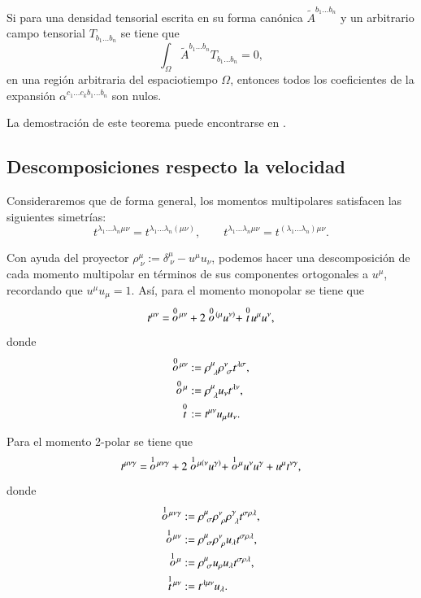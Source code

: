 \begin{theorem}
\label{teo:2}
Si para una densidad tensorial escrita en su forma canónica $\tilde{A}^{b_1 \dots b_n}$ y un arbitrario campo tensorial $T_{b_1 \dots b_n}$ se tiene que
\begin{equation}
\int_{\Omega}  \tilde{A}^{b_1 \dots b_n}T_{b_1 \dots b_n} = 0,
\end{equation}
en una región arbitraria del espaciotiempo $\Omega$, entonces todos los coeficientes de la expansión $\alpha^{c_1 \dots c_k b_1 \dots b_n}$ son nulos.
\end{theorem}

La demostración de este teorema puede encontrarse en \cite{Tulczyjew}.

\subsection{Descomposiciones respecto la velocidad}

Consideraremos que de forma general, los momentos multipolares satisfacen las siguientes simetrías:
\begin{equation}
t^{\lambda_1 \dots \lambda_n \mu \nu} = t^{\lambda_1 \dots \lambda_n (\mu \nu)}, \qquad t^{\lambda_1 \dots \lambda_n \mu \nu} = t^{(\lambda_1 \dots \lambda_n) \mu \nu}.
\end{equation}

Con ayuda del proyector $\rho^{\mu}_{\ \nu} := \delta^{\mu}_{\ \nu} - u^{\mu}u_{\nu}$, podemos hacer una descomposición de cada momento multipolar en términos de sus componentes ortogonales a $u^{\mu}$, recordando que $u^{\mu}u_{\mu} = 1$. Así, para el momento monopolar se tiene que
\begin{equation}
\label{eq:23}
t^{\mu \nu} = \ \stackrel{0}{o}{\!}^{\mu \nu} + 2 \stackrel{0}{o}{\!}^{(\mu} u^{\nu )} + \stackrel{0}{t}{\!} u^{\mu} u^{\nu},
\end{equation}
donde
\begin{align*}
\des{0}{o}^{\mu \nu} &:=  \rho^{\mu}_{\ \lambda} \rho^{\nu}_{\ \sigma} t^{\lambda \sigma},\\
\des{0}{o}^{\mu} &:= \rho^{\mu}_{\ \lambda} u_{\nu} t^{\lambda \nu},\\
\des{0}{t} &:= t^{\mu \nu} u_{\mu} u_{\nu}.
\end{align*}

Para el momento 2-polar se tiene que
\begin{equation}
\label{eq:24}
t^{\mu \nu \gamma} = \ \stackrel{1}{o}{\!}^{\mu \nu \gamma} + 2 \stackrel{1}{o}{\!}^{\mu ( \nu} u^{\gamma )} + \stackrel{1}{o}{\!}^{\mu} u^{\nu} u^{\gamma} + u^{\mu} t^{\nu \gamma},
\end{equation}
donde
\begin{align*}
\des{1}{o}^{\mu \nu \gamma} &:= \rho^{\mu}_{\ \sigma} \rho^{\nu}_{\ \rho} \rho^{\gamma}_{\ \lambda} t^{\sigma \rho \lambda},\\
\des{1}{o}^{\mu \nu} &:= \rho^{\mu}_{\ \sigma} \rho^{\nu}_{\ \rho} u_{\lambda} t^{\sigma \rho \lambda},\\
\des{1}{o}^{\mu} &:= \rho^{\mu}_{\ \sigma} u_{\rho} u_{\lambda} t^{\sigma \rho \lambda},\\
\des{1}{t}^{\mu \nu} &:= t^{\lambda \mu \nu} u_{\lambda}.
\end{align*}

